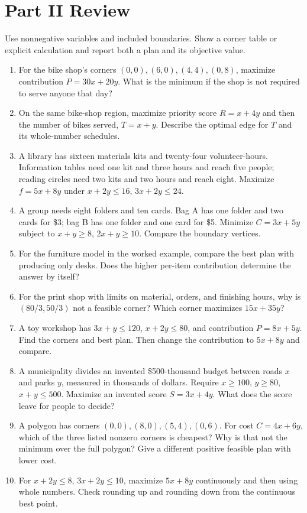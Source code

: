 \documentclass[11pt,letterpaper]{article}
\begin{document}
\section*{Part II Review}
Use nonnegative variables and included boundaries. Show a corner table or explicit calculation and report both a plan and its objective value.
\begin{enumerate}
\item For the bike shop's corners $(0,0),(6,0),(4,4),(0,8)$, maximize contribution $P=30x+20y$. What is the minimum if the shop is not required to serve anyone that day?
\item On the same bike-shop region, maximize priority score $R=x+4y$ and then the number of bikes served, $T=x+y$. Describe the optimal edge for $T$ and its whole-number schedules.
\item A library has sixteen materials kits and twenty-four volunteer-hours. Information tables need one kit and three hours and reach five people; reading circles need two kits and two hours and reach eight. Maximize $f=5x+8y$ under $x+2y\leq16$, $3x+2y\leq24$.
\item A group needs eight folders and ten cards. Bag A has one folder and two cards for \$3; bag B has one folder and one card for \$5. Minimize $C=3x+5y$ subject to $x+y\geq8$, $2x+y\geq10$. Compare the boundary vertices.
\item For the furniture model in the worked example, compare the best plan with producing only desks. Does the higher per-item contribution determine the answer by itself?
\item For the print shop with limits on material, orders, and finishing hours, why is $(80/3,50/3)$ not a feasible corner? Which corner maximizes $15x+35y$?
\item A toy workshop has $3x+y\leq120$, $x+2y\leq80$, and contribution $P=8x+5y$. Find the corners and best plan. Then change the contribution to $5x+8y$ and compare.
\item A municipality divides an invented \$500-thousand budget between roads $x$ and parks $y$, measured in thousands of dollars. Require $x\geq100$, $y\geq80$, $x+y\leq500$. Maximize an invented score $S=3x+4y$. What does the score leave for people to decide?
\item A polygon has corners $(0,0),(8,0),(5,4),(0,6)$. For cost $C=4x+6y$, which of the three listed nonzero corners is cheapest? Why is that not the minimum over the full polygon? Give a different positive feasible plan with lower cost.
\item For $x+2y\leq8$, $3x+2y\leq10$, maximize $5x+8y$ continuously and then using whole numbers. Check rounding up and rounding down from the continuous best point.

\end{enumerate}
\end{document}
